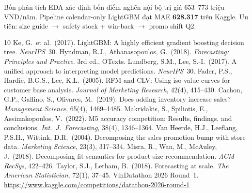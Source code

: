 \documentclass{article}
\begin{document}
Bốn phân tích EDA xác định bốn điểm nghẽn nội bộ trị giá 653--773 triệu VND/năm.
Pipeline calendar-only LightGBM đạt MAE \textbf{628.317} trên Kaggle.
Ưu tiên: size guide $\to$ safety stock + win-back $\to$ promo shift Q2.

\begin{thebibliography}{10}
  Ke, G.\ et al.\ (2017).
  LightGBM: A highly efficient gradient boosting decision tree. \emph{NeurIPS}~30.
  Hyndman, R.J., Athanasopoulos, G.\ (2018).
  \emph{Forecasting: Principles and Practice}. 3rd ed., OTexts.
  Lundberg, S.M., Lee, S.-I.\ (2017).
  A unified approach to interpreting model predictions. \emph{NeurIPS}~30.
  Fader, P.S., Hardie, B.G.S., Lee, K.L.\ (2005).
  RFM and CLV: Using iso-value curves for customer base analysis.
  \emph{Journal of Marketing Research}, 42(4), 415--430.
  Cachon, G.P., Gallino, S., Olivares, M.\ (2019).
  Does adding inventory increase sales?
  \emph{Management Science}, 65(4), 1469--1485.
  Makridakis, S., Spiliotis, E., Assimakopoulos, V.\ (2022).
  M5 accuracy competition: Results, findings, and conclusions.
  \emph{Int.\ J.\ Forecasting}, 38(4), 1346--1364.
  Van Heerde, H.J., Leeflang, P.S.H., Wittink, D.R.\ (2004).
  Decomposing the sales promotion bump with store data.
  \emph{Marketing Science}, 23(3), 317--334.
  Misra, R., Wan, M., McAuley, J.\ (2018).
  Decomposing fit semantics for product size recommendation.
  \emph{ACM RecSys}, 422--426.
  Taylor, S.J., Letham, B.\ (2018).
  Forecasting at scale.
  \emph{The American Statistician}, 72(1), 37--45.
  VinDatathon 2026 Round~1.
  \url{https://www.kaggle.com/competitions/datathon-2026-round-1}
\end{thebibliography}
\end{document}
